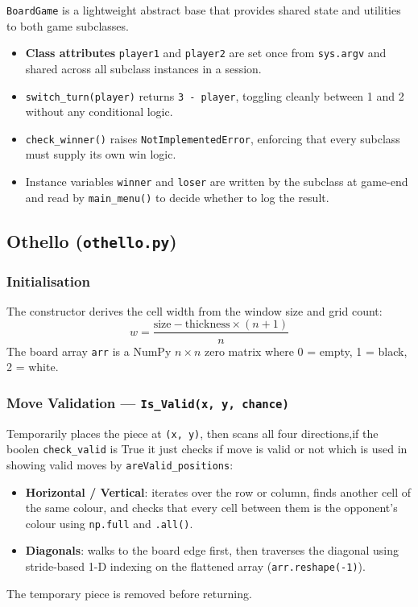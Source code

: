 \documentclass[12pt]{article}
\begin{document}
\texttt{BoardGame} is a lightweight abstract base that provides shared state and utilities to both game subclasses.
 
\begin{itemize}
    \item \textbf{Class attributes} \texttt{player1} and \texttt{player2} are set once from \texttt{sys.argv} and shared across all subclass instances in a session.
    \item \texttt{switch\_turn(player)} returns \texttt{3 - player}, toggling cleanly between 1 and 2 without any conditional logic.
    \item \texttt{check\_winner()} raises \texttt{NotImplementedError}, enforcing that every subclass must supply its own win logic.
    \item Instance variables \texttt{winner} and \texttt{loser} are written by the subclass at game-end and read by \texttt{main\_menu()} to decide whether to log the result.
\end{itemize}
 
\subsection{Othello (\texttt{othello.py})}
 
\subsubsection{Initialisation}
 
The constructor derives the cell width from the window size and grid count:
\[
w = \frac{\text{size} - \text{thickness} \times (n+1)}{n}
\]
The board array \texttt{arr} is a NumPy $n \times n$ zero matrix where 0 = empty, 1 = black, 2 = white.
 
\subsubsection{Move Validation --- \texttt{Is\_Valid(x, y, chance)}}
 
Temporarily places the piece at \texttt{(x, y)}, then scans all four directions,if the boolen \texttt{check\_valid} is True it just checks if move is valid or not which is used in showing valid moves by \texttt{areValid\_positions}:
\begin{itemize}
    \item \textbf{Horizontal / Vertical}: iterates over the row or column, finds another cell of the same colour, and checks that every cell between them is the opponent's colour using \texttt{np.full} and \texttt{.all()}.
    \item \textbf{Diagonals}: walks to the board edge first, then traverses the diagonal using stride-based 1-D indexing on the flattened array (\texttt{arr.reshape(-1)}).
\end{itemize}
The temporary piece is removed before returning.
 
\end{document}
